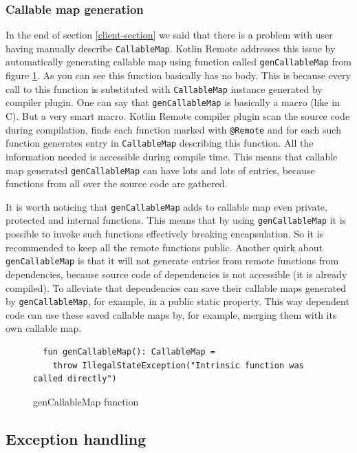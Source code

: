 \documentclass[a4paper,11pt,oneside]{article}
\newcommand{\kotlini}[1]{\texttt{#1}}
\newcommand{\ki}[1]{\kotlini{#1}}
\begin{document}
\subsubsection{Callable map generation} \label{callable_map_generation}

In the end of section \ref{client-section} we said that there is a problem with user having
manually describe \ki{CallableMap}. Kotlin Remote addresses this issue by automatically generating
callable map using function called \ki{genCallableMap} from figure \ref{gen_callable_map}. As you
can see this function basically has no body. This is because every call to this function is
substituted with \ki{CallableMap} instance generated by compiler plugin. One can say that
\ki{genCallableMap} is basically a macro (like in C). But a very smart macro. Kotlin Remote
compiler plugin scan the source code during compilation, finds each function marked with
\ki{@Remote} and for each such function generates entry in \ki{CallableMap} describing this
function. All the information needed is accessible during compile time. This means that callable map
generated \ki{genCallableMap} can have lots and lots of entries, because functions from all over the 
source code are gathered.

It is worth noticing that \ki{genCallableMap} adds to callable map even private, protected and internal
functions. This means that by using \ki{genCallableMap} it is possible to invoke such functions 
effectively breaking encapsulation. So it is recommended to keep all the remote functions public. 
Another quirk about \ki{genCallableMap} is that it will not generate entries from remote functions 
from dependencies, because source code of dependencies is not accessible (it is already compiled). 
To alleviate that dependencies can save their callable maps generated by \ki{genCallableMap}, for example,
in a public static property. This way dependent code can use these saved callable maps by, for example,
merging them with its own callable map. 

\begin{figure}[!h]
  \begin{verbatim}
  fun genCallableMap(): CallableMap = 
    throw IllegalStateException("Intrinsic function was called directly")
  \end{verbatim}
  \caption{genCallableMap function}\label{gen_callable_map}
\end{figure}

\subsection{Exception handling}
\end{document}
